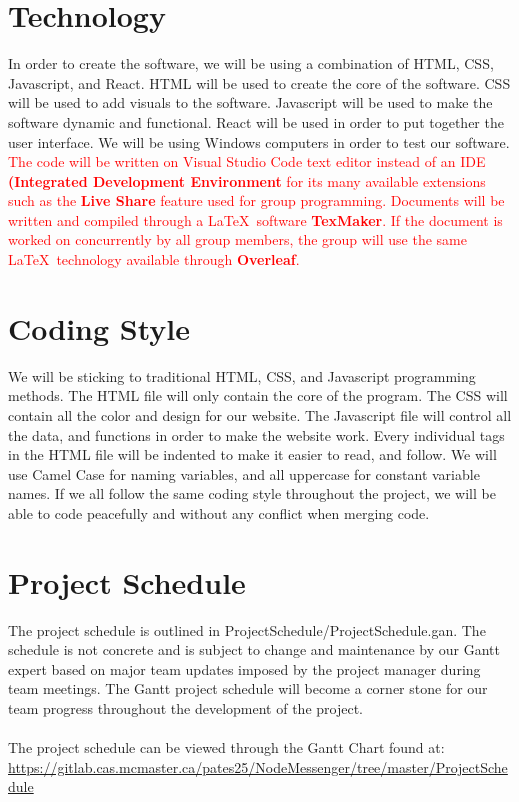 \documentclass{article}
\begin{document}
\section{Technology}
In order to create the software, we will be using a combination of HTML, CSS, Javascript, and React. HTML will be used to create the core of the software. CSS will be used to add visuals to the software. Javascript will be used to make the software dynamic and functional. React will be used in order to put together the user interface. We will be using Windows computers in order to test our software. \textcolor{red}{The code will be written on Visual Studio Code text editor instead of an IDE \textbf{(Integrated Development Environment} for its many available extensions such as the \textbf{Live Share} feature used for group programming. Documents will be written and compiled through a \LaTeX\ software \textbf{TexMaker}. If the document is worked on concurrently by all group members, the group will use the same \LaTeX\ technology available through \textbf{Overleaf}.}
\section{Coding Style}
We will be sticking to traditional HTML, CSS, and Javascript programming methods. The HTML file will only contain the core of the program. The CSS will contain all the color and design for our website. The Javascript file will control all the data, and functions in order to make the website work. Every individual tags in the HTML file will be indented to make it easier to read, and follow. We will use Camel Case for naming variables, and all uppercase for constant variable names. If we all follow the same coding style throughout the project, we will be able to code peacefully and without any conflict when merging code.
\section{Project Schedule}
The project schedule is outlined in ProjectSchedule/ProjectSchedule.gan. The schedule is not concrete and is subject to change and maintenance by our Gantt expert based on major team updates imposed by the project manager during team meetings. The Gantt project schedule will become a corner stone for our team progress throughout the development of the project.\\
\\
The project schedule can be viewed through the Gantt Chart found at:\\
\url{https://gitlab.cas.mcmaster.ca/pates25/NodeMessenger/tree/master/ProjectSchedule}
\end{document}
